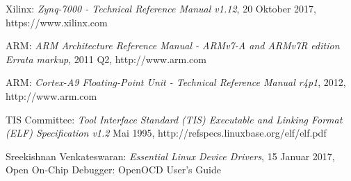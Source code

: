 \begingroup
\renewcommand{\chapter}[2]{\section#1{#2}}%
\begin{thebibliography}{99}




	Xilinx:
	\emph{Zynq-7000 - Technical Reference Manual v1.12},
	20 Oktober 2017, https://www.xilinx.com

	ARM:
	\emph{ARM Architecture Reference Manual - ARMv7-A and ARMv7R edition Errata markup},
	2011 Q2, http://www.arm.com

	ARM:
	\emph{Cortex-A9 Floating-Point Unit - Technical Reference Manual r4p1},
	2012, http://www.arm.com


	TIS Committee:
	\emph{Tool Interface Standard (TIS) Executable and Linking Format (ELF) Specification v1.2}
	Mai 1995, http://refspecs.linuxbase.org/elf/elf.pdf

	
	Sreekishnan Venkateswaran:
	\emph{Essential Linux Device Drivers},
	15 Januar 2017, Open On-Chip Debugger: OpenOCD User's Guide









	\end{thebibliography}
\endgroup